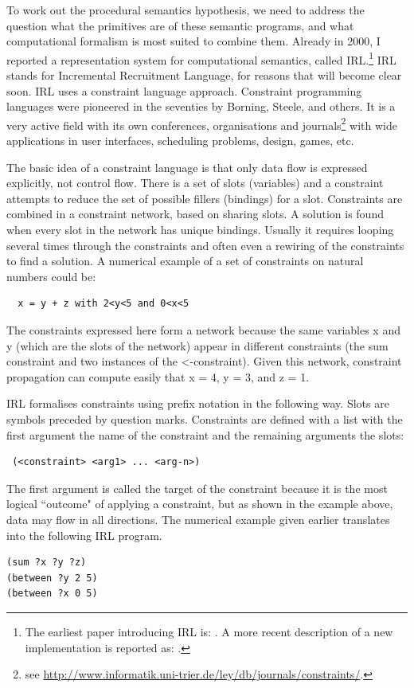 To work out the procedural semantics hypothesis, we need to address the question what the primitives are of 
these semantic programs, and what computational formalism is most suited to combine them. Already in 2000, I reported
a representation system for computational semantics, called IRL.\footnote{
The earliest paper introducing IRL is: \cite{Steels:2000}. 
A more recent description of a new implementation is reported as: \cite{Spranger:2012}.}
IRL stands for Incremental Recruitment Language, for reasons that will become clear soon. 
IRL uses a constraint language approach. Constraint programming languages were pioneered in the  
seventies by Borning, Steele, and others. It is a very active field with its own conferences, 
organisations and journals\footnote{see \url{http://www.informatik.uni-trier.de/ley/db/journals/constraints/}.} 
with wide applications in user interfaces, scheduling problems, design, games, etc. 

The basic idea of a constraint language is that only data flow is expressed explicitly, not control flow. 
There is a set of slots (variables) and a constraint attempts to reduce the set of possible 
fillers (bindings) for a slot. Constraints are combined in 
a constraint network, based on sharing slots. A solution is found when every slot in the network has unique bindings. 
Usually it requires looping several times through the constraints and often even a rewiring of the constraints to 
find a solution. A numerical example of a set of constraints on natural numbers could be:
\begin{verbatim}
  x = y + z with 2<y<5 and 0<x<5
\end{verbatim}
The constraints expressed here form a network because the same variables x and y (which are the slots of the 
network) appear in different constraints (the sum constraint and two instances of the <-constraint). 
Given this network, constraint propagation can compute easily that x = 4, y = 3, and z = 1. 

\enlargethispage{2\baselineskip}
IRL formalises constraints using prefix notation in the following way. Slots are symbols preceded 
by question marks. Constraints are defined with a list with the first argument the name of the constraint and 
the remaining arguments the slots: 
\begin{verbatim}
 (<constraint> <arg1> ... <arg-n>)
\end{verbatim}
The first argument is called the target of the constraint because it is the most logical ``outcome" 
of applying a constraint, but as shown in the example above, data may flow in all directions. The numerical 
example given earlier translates into the following IRL program. 
\begin{verbatim}
(sum ?x ?y ?z)
(between ?y 2 5)
(between ?x 0 5)
\end{verbatim}

